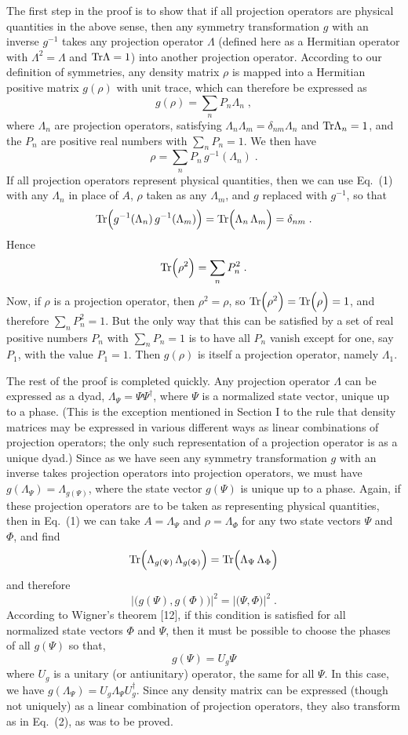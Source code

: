 \documentclass[12pt]{article}
\begin{document}
The first step in the proof is to show that if all projection operators are physical quantities in the above sense, then any symmetry transformation $g$ with an inverse $g^{-1}$ takes any   projection operator $\Lambda$ (defined here as a Hermitian operator with $\Lambda^2=\Lambda$ and ${\rm Tr}\Lambda=1$)  into another projection operator.    According to our definition of symmetries,  any density matrix $\rho$ is mapped into a Hermitian positive matrix  $g(\rho)$ with unit trace, which can therefore be expressed as
$$g(\rho)=\sum_n P_n\Lambda_n\;,$$
where $\Lambda_n$ are projection operators, satisfying $\Lambda_n\Lambda_m=\delta_{nm}\Lambda_n$ and ${\rm Tr}\Lambda_n=1$, and the $P_n$ are positive real numbers with $\sum_n P_n=1$.  We then have
$$\rho=\sum_n P_n\,g^{-1}(\Lambda_n)\;.$$
If all projection operators represent physical quantities, then we can use Eq.~(1) with any $\Lambda_n$ in place of $A$, $\rho$ taken as any $\Lambda_m$, and $g$ replaced with $g^{-1}$, so that
$${\rm Tr}\Big(g^{-1}(\Lambda_n)\,g^{-1}(\Lambda_m)\Big)={\rm Tr}\Big(\Lambda_n\,\Lambda_m\Big)=\delta_{nm}\;.$$
Hence 
$${\rm Tr}\Big(\rho^2\Big)=\sum_n P_n^2\;.$$
Now, if $\rho$ is a projection operator, then $\rho^2=\rho$, so ${\rm Tr}\Big(\rho^2\Big)={\rm Tr}\Big(\rho\Big)=1$,
and therefore $\sum_n P_n^2=1$.  But the only way that this can be satisfied by a set of real positive numbers $P_n$ with $\sum_n P_n=1$ is to have all $P_n$ vanish except for one, say $P_1$, with the value $P_1=1$.  Then $g(\rho)$ is itself a projection operator, namely $\Lambda_1$.

The rest of the proof is completed quickly. Any projection operator $\Lambda$ can be expressed as a dyad, $\Lambda_\Psi=\Psi\Psi^\dagger$, where $\Psi$ is a normalized state vector, unique up to a phase.  (This is the exception mentioned in Section I to the rule that density   matrices may be expressed in various different ways as linear combinations  of projection operators; the only such representation of a projection operator is as a unique dyad.)  Since as we have seen any symmetry transformation $g$ with an inverse takes projection operators into projection operators, we must have $g(\Lambda_\Psi)=\Lambda_{g(\Psi)}$, where the state vector $g(\Psi)$ is unique up to a phase.  Again, if these projection operators are to be taken as representing physical quantities, then in Eq.~(1) we can take $A=\Lambda_\Psi$ and $\rho=\Lambda_\Phi$ for any two state vectors $\Psi$ and $\Phi$, and find 
$${\rm Tr}\Big(\Lambda_{g(\Psi)}\,\Lambda_{g(\Phi)}\Big)={\rm Tr}\Big(\Lambda_\Psi\,\Lambda_\Phi\Big)$$
 and therefore
$$\left|\Big(g(\Psi),g(\Phi)\Big)\right|^2=\left|\Big(\Psi,\Phi\Big)\right|^2\;.$$
According to Wigner's theorem [12], if this condition is satisfied for all normalized state vectors $\Phi$ and $\Psi$, then it must be possible to choose the phases of all $g(\Psi)$  so that,
$$ g(\Psi)=U_g\Psi$$
where $U_g$ is a unitary (or antiunitary) operator, the same for all $\Psi$.  In this case, we have $g(\Lambda_\Psi)=U_g \Lambda_\Psi U_g^\dagger$.  Since any density matrix can be expressed (though not uniquely) as a linear combination of projection operators, they also transform as in Eq.~(2), as was to be proved.
\end{document}
